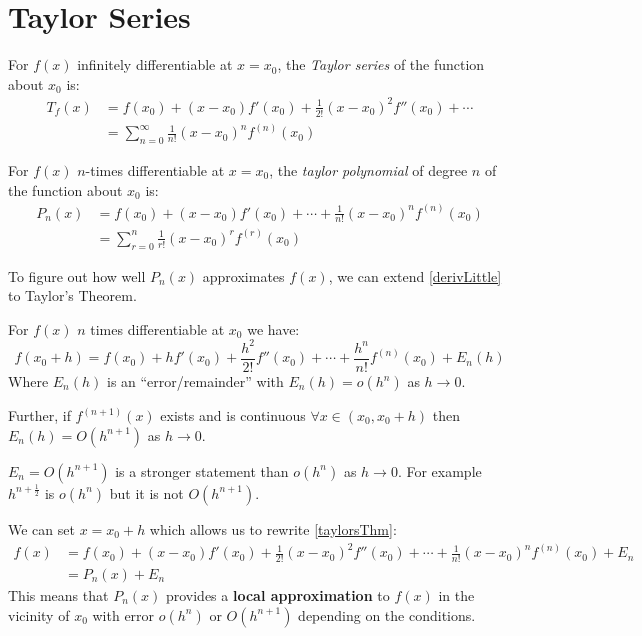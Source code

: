 \documentclass[../main.tex]{subfiles}
\begin{document}
\section{Taylor Series}
\begin{definition}
 For $f(x)$ infinitely differentiable at $x = x_0$, the \textit{Taylor series} of the function about $x_0$ is:
 \begin{align*}
   T_f(x) &= f(x_0) + (x - x_0)f'(x_0) + \frac{1}{2!}(x - x_0)^2 f''(x_0) + \cdots \\
          &= \sum_{n=0}^{\infty} \frac{1}{n!} (x-x_0)^{n} f^{(n)}(x_0)
 \end{align*}
\end{definition}
\begin{definition}
  For $f(x)$ $n$-times differentiable at $x = x_0$, the \textit{taylor polynomial} of degree $n$ of the function about $x_0$ is:
  \begin{align*}
    P_n(x) &= f(x_0) + (x - x_0)f'(x_0) + \cdots + \frac{1}{n!} (x - x_0)^{n} f^{(n)}(x_0) \\
           &= \sum_{r=0}^{n} \frac{1}{r!} (x-x_0)^{r} f^{(r)}(x_0)
  \end{align*}
\end{definition}
To figure out how well $P_n(x)$ approximates $f(x)$, we can extend \cref{derivLittle} to Taylor's Theorem.
\begin{theorem}
  For $f(x)$ $n$ times differentiable at $x_0$ we have: \label{taylorsThm}
  \[
    f(x_0 + h) = f(x_0) + hf'(x_0) + \frac{h^2}{2!}f''(x_0) + \cdots + \frac{h^{n}}{n!} f^{(n)} (x_0) + E_n(h)
  \]
  Where $E_n(h)$ is an ``error/remainder'' with $E_n(h) = o(h^{n})$ as $h \to 0$.

  Further, if $f^{(n+1)}(x)$ exists and is continuous $\forall x \in (x_0, x_0 + h)$ then $E_n(h) = O(h^{n+1})$ as $h \to 0$.
\end{theorem}
\begin{remark}
  $E_n = O(h^{n + 1})$ is  a stronger statement than $o(h^{n})$ as $h \to 0$.
  For example $h^{n + \frac{1}{2}}$ is $o(h^{n})$ but it is not $O(h^{n + 1})$.
\end{remark}
We can set $x = x_0 + h$ which allows us to rewrite \cref{taylorsThm}:
\begin{align*}
  f(x) &= f(x_0) + (x - x_0)f'(x_0) + \frac{1}{2!}(x - x_0)^2f''(x_0) + \cdots + \frac{1}{n!}(x - x_0)^{n} f^{(n)}(x_0) + E_n \\
       &= P_n(x) + E_n
\end{align*}
This means that $P_n(x)$ provides a \textbf{local approximation} to $f(x)$ in the vicinity of $x_0$ with error $o(h^{n})$ or $O(h^{n + 1})$ depending on the conditions.
\end{document}
